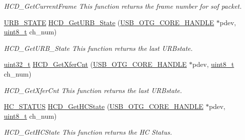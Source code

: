 \begin{DoxyCompactItemize}
\begin{DoxyCompactList}\small\item\em H\-C\-D\-\_\-\-Get\-Current\-Frame This function returns the frame number for sof packet. \end{DoxyCompactList}\item 
\hyperlink{group___u_s_b___c_o_r_e___exported___types_ga05286e84306322d89383fc7b6853e717}{U\-R\-B\-\_\-\-S\-T\-A\-T\-E} \hyperlink{group___u_s_b___h_c_d___exported___functions_prototype_ga950fe167493f7dc6a66ca536de6f70b4}{H\-C\-D\-\_\-\-Get\-U\-R\-B\-\_\-\-State} (\hyperlink{group___u_s_b___c_o_r_e___exported___types_gaf76054c11eb8a3367907aad7ae700e80}{U\-S\-B\-\_\-\-O\-T\-G\-\_\-\-C\-O\-R\-E\-\_\-\-H\-A\-N\-D\-L\-E} $\ast$pdev, \hyperlink{stdint_8h_aba7bc1797add20fe3efdf37ced1182c5}{uint8\-\_\-t} ch\-\_\-num)
\begin{DoxyCompactList}\small\item\em H\-C\-D\-\_\-\-Get\-U\-R\-B\-\_\-\-State This function returns the last U\-R\-Bstate. \end{DoxyCompactList}\item 
\hyperlink{stdint_8h_a435d1572bf3f880d55459d9805097f62}{uint32\-\_\-t} \hyperlink{group___u_s_b___h_c_d___exported___functions_prototype_gafc5ff8391e45b525c0c243477e7fd59a}{H\-C\-D\-\_\-\-Get\-Xfer\-Cnt} (\hyperlink{group___u_s_b___c_o_r_e___exported___types_gaf76054c11eb8a3367907aad7ae700e80}{U\-S\-B\-\_\-\-O\-T\-G\-\_\-\-C\-O\-R\-E\-\_\-\-H\-A\-N\-D\-L\-E} $\ast$pdev, \hyperlink{stdint_8h_aba7bc1797add20fe3efdf37ced1182c5}{uint8\-\_\-t} ch\-\_\-num)
\begin{DoxyCompactList}\small\item\em H\-C\-D\-\_\-\-Get\-Xfer\-Cnt This function returns the last U\-R\-Bstate. \end{DoxyCompactList}\item 
\hyperlink{group___u_s_b___c_o_r_e___exported___types_gaa3b5cdc33c598d3e76e186f3b6ae5cd3}{H\-C\-\_\-\-S\-T\-A\-T\-U\-S} \hyperlink{group___u_s_b___h_c_d___exported___functions_prototype_gae346a15d3639b390b6a745f04dae3a39}{H\-C\-D\-\_\-\-Get\-H\-C\-State} (\hyperlink{group___u_s_b___c_o_r_e___exported___types_gaf76054c11eb8a3367907aad7ae700e80}{U\-S\-B\-\_\-\-O\-T\-G\-\_\-\-C\-O\-R\-E\-\_\-\-H\-A\-N\-D\-L\-E} $\ast$pdev, \hyperlink{stdint_8h_aba7bc1797add20fe3efdf37ced1182c5}{uint8\-\_\-t} ch\-\_\-num)
\begin{DoxyCompactList}\small\item\em H\-C\-D\-\_\-\-Get\-H\-C\-State This function returns the H\-C Status. \end{DoxyCompactList}\end{DoxyCompactItemize}


